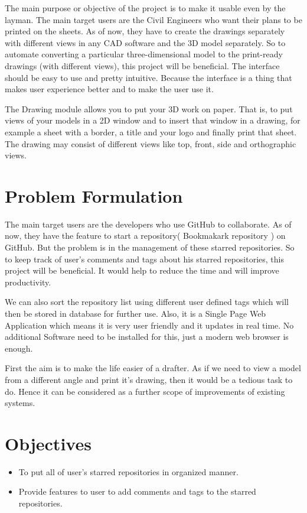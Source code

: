 The main purpose or objective of the project is to make it usable even by the layman. The main target users are the Civil Engineers who want their plans to be printed on the sheets. As of now, they have to create the drawings separately with different views in any CAD software and the 3D model separately. So to automate converting a particular three-dimensional model to the print-ready drawings (with different views), this project will be beneficial. The interface should be easy to use and pretty intuitive. Because the interface is a thing that makes user experience better and to make the user use it.

The Drawing module allows you to put your 3D work on paper. That is, to put views of your models in a 2D window and to insert that window in a drawing, for example a sheet with a border, a title and your logo and finally print that sheet. The drawing may consist of different views like top, front, side and orthographic views.

\section{Problem Formulation}

The main target users are the developers who use GitHub to collaborate. As of now, they have the feature to start a repository( Bookmakark repository ) on GitHub. But the problem is in the management of these starred repositories. So to keep track of user's comments and tags about his starred repositories, this project will be beneficial. It would help to reduce the time and will improve productivity.

We can also sort the repository list using different user defined tags which will then be stored in database for further use. Also, it is a Single Page Web Application which means it is very user friendly and it updates in real time. No additional Software need to be installed for this, just a modern web browser is enough. 


First the aim is to make the life easier of a drafter. As if we need to view a model from a different angle and print it's drawing, then it would be a tedious task to do. Hence it can be considered as a further scope of improvements of existing systems.

\section{Objectives}
\begin{itemize}
\item To put all of user's starred repositories in organized manner.
\item Provide features to user to add comments and tags to the starred repositories.
\end{itemize}


